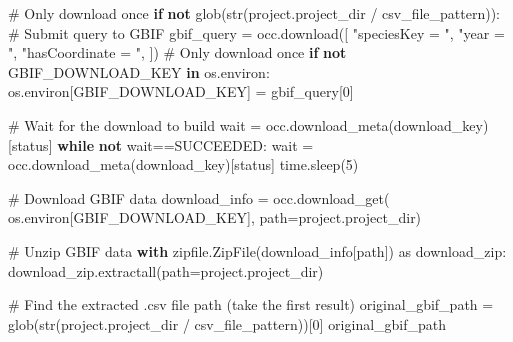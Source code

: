 \documentclass[
  letterpaper,
  DIV=11,
  numbers=noendperiod,
  oneside]{scrreprt}
\newenvironment{Shaded}{\begin{snugshade}}{\end{snugshade}}
\newcommand{\BuiltInTok}[1]{\textcolor[rgb]{0.00,0.23,0.31}{#1}}
\newcommand{\CommentTok}[1]{\textcolor[rgb]{0.37,0.37,0.37}{#1}}
\newcommand{\ControlFlowTok}[1]{\textcolor[rgb]{0.00,0.23,0.31}{\textbf{#1}}}
\newcommand{\DecValTok}[1]{\textcolor[rgb]{0.68,0.00,0.00}{#1}}
\newcommand{\ImportTok}[1]{\textcolor[rgb]{0.00,0.46,0.62}{#1}}
\newcommand{\KeywordTok}[1]{\textcolor[rgb]{0.00,0.23,0.31}{\textbf{#1}}}
\newcommand{\NormalTok}[1]{\textcolor[rgb]{0.00,0.23,0.31}{#1}}
\newcommand{\OperatorTok}[1]{\textcolor[rgb]{0.37,0.37,0.37}{#1}}
\newcommand{\StringTok}[1]{\textcolor[rgb]{0.13,0.47,0.30}{#1}}
\begin{document}
\begin{Shaded}
\begin{Highlighting}[]
\CommentTok{\# Only download once}
\ControlFlowTok{if} \KeywordTok{not}\NormalTok{ glob(}\BuiltInTok{str}\NormalTok{(project.project\_dir }\OperatorTok{/}\NormalTok{ csv\_file\_pattern)):}
    \CommentTok{\# Submit query to GBIF}
\NormalTok{    gbif\_query }\OperatorTok{=}\NormalTok{ occ.download([}
        \StringTok{"speciesKey = "}\NormalTok{,}
        \StringTok{"year = "}\NormalTok{,}
        \StringTok{"hasCoordinate = "}\NormalTok{,}
\NormalTok{    ])}
    \CommentTok{\# Only download once}
    \ControlFlowTok{if} \KeywordTok{not} \StringTok{\textquotesingle{}GBIF\_DOWNLOAD\_KEY\textquotesingle{}} \KeywordTok{in}\NormalTok{ os.environ:}
\NormalTok{        os.environ[}\StringTok{\textquotesingle{}GBIF\_DOWNLOAD\_KEY\textquotesingle{}}\NormalTok{] }\OperatorTok{=}\NormalTok{ gbif\_query[}\DecValTok{0}\NormalTok{]}

        \CommentTok{\# Wait for the download to build}
\NormalTok{        wait }\OperatorTok{=}\NormalTok{ occ.download\_meta(download\_key)[}\StringTok{\textquotesingle{}status\textquotesingle{}}\NormalTok{]}
        \ControlFlowTok{while} \KeywordTok{not}\NormalTok{ wait}\OperatorTok{==}\StringTok{\textquotesingle{}SUCCEEDED\textquotesingle{}}\NormalTok{:}
\NormalTok{            wait }\OperatorTok{=}\NormalTok{ occ.download\_meta(download\_key)[}\StringTok{\textquotesingle{}status\textquotesingle{}}\NormalTok{]}
\NormalTok{            time.sleep(}\DecValTok{5}\NormalTok{)}

    \CommentTok{\# Download GBIF data}
\NormalTok{    download\_info }\OperatorTok{=}\NormalTok{ occ.download\_get(}
\NormalTok{        os.environ[}\StringTok{\textquotesingle{}GBIF\_DOWNLOAD\_KEY\textquotesingle{}}\NormalTok{], }
\NormalTok{        path}\OperatorTok{=}\NormalTok{project.project\_dir)}

    \CommentTok{\# Unzip GBIF data}
    \ControlFlowTok{with}\NormalTok{ zipfile.ZipFile(download\_info[}\StringTok{\textquotesingle{}path\textquotesingle{}}\NormalTok{]) }\ImportTok{as}\NormalTok{ download\_zip:}
\NormalTok{        download\_zip.extractall(path}\OperatorTok{=}\NormalTok{project.project\_dir)}

\CommentTok{\# Find the extracted .csv file path (take the first result)}
\NormalTok{original\_gbif\_path }\OperatorTok{=}\NormalTok{ glob(}\BuiltInTok{str}\NormalTok{(project.project\_dir }\OperatorTok{/}\NormalTok{ csv\_file\_pattern))[}\DecValTok{0}\NormalTok{]}
\NormalTok{original\_gbif\_path}
\end{Highlighting}
\end{Shaded}
\end{document}
